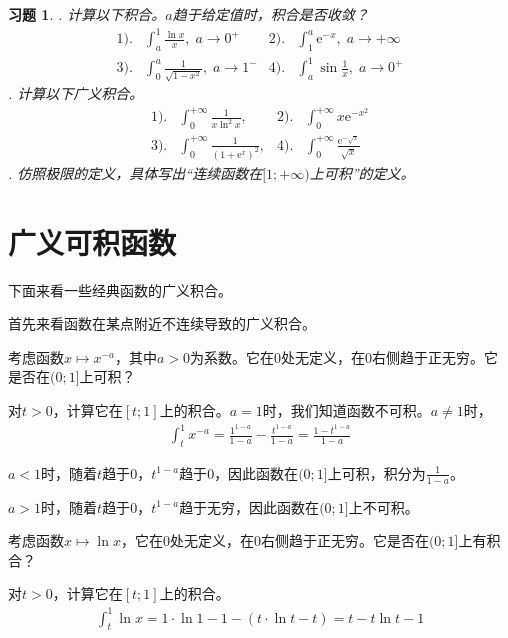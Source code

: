 \documentclass[12pt,UTF8]{ctexbook}
\newcommand{\e}{\mathrm{e}}
\theoremstyle{definition}
\theoremstyle{plain}
\newtheorem{xt}{习题}[section]
\begin{document}
\begin{xt}
    . 计算以下积合。$a$趋于给定值时，积合是否收敛？\\    
    \begin{align*}
        1).& \int_a^{1} \frac{\ln{x}}{x} , \; a\to 0^+  &2).& \int_1^{a} \e^{-x},  \; a\to +\infty \\[3pt]
        3).& \int_0^{a} \frac{1}{\sqrt{1 - x^2}}, \; a\to 1^-   & 4).& \int_a^{1} \sin{\frac{1}{x}}, \; a\to 0^+ 
    \end{align*}
    . 计算以下广义积合。\\    
    \begin{align*}
        1).& \int_0^{+\infty} \frac{1}{x\ln^2{x}} ,  &2).& \int_0^{+\infty} x\e^{-x^2} \\[3pt]
        3).& \int_0^{+\infty} \frac{1}{(1 + \e^{x})^2},  & 4).& \int_0^{+\infty} \frac{\e^{-\sqrt{x}}}{\sqrt{x}}
    \end{align*}
    . 仿照极限的定义，具体写出“连续函数在$[1;+\infty)$上可积”的定义。\\

\end{xt}

\section{广义可积函数}

下面来看一些经典函数的广义积合。

首先来看函数在某点附近不连续导致的广义积合。

考虑函数$x\mapsto x^{-a}$，其中$a>0$为系数。它在$0$处无定义，在$0$右侧趋于正无穷。它是否在$(0;1]$上可积？

对$t>0$，计算它在$[t;1]$上的积合。$a=1$时，我们知道函数不可积。$a\neq 1$时，
\begin{align*}
    \int_t^1 x^{-a} = \frac{1^{1-a}}{1 - a} - \frac{t^{1-a}}{1 - a} = \frac{1 - t^{1-a}}{1-a} 
\end{align*}

$a<1$时，随着$t$趋于$0$，$t^{1-a}$趋于$0$，因此函数在$(0;1]$上可积，积分为$\frac{1}{1-a}$。

$a>1$时，随着$t$趋于$0$，$t^{1-a}$趋于无穷，因此函数在$(0;1]$上不可积。

考虑函数$x\mapsto \ln{x}$，它在$0$处无定义，在$0$右侧趋于正无穷。它是否在$(0;1]$上有积合？

对$t>0$，计算它在$[t;1]$上的积合。
\begin{align*}
    \int_t^1 \ln{x} = 1\cdot \ln{1} - 1 - (t\cdot\ln{t} - t)= t - t\ln{t} - 1
\end{align*}
\end{document}
